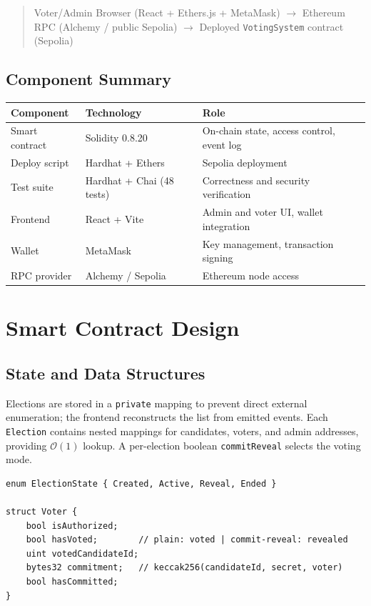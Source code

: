 \documentclass[11pt]{article}
\begin{document}
\begin{quote}
Voter/Admin Browser (React + Ethers.js + MetaMask) $\rightarrow$ Ethereum RPC (Alchemy /
public Sepolia) $\rightarrow$ Deployed \texttt{VotingSystem} contract (Sepolia)
\end{quote}

\subsection{Component Summary}
\begin{center}
\begin{tabular}{@{}lll@{}}
\toprule
\textbf{Component} & \textbf{Technology} & \textbf{Role} \\
\midrule
Smart contract & Solidity 0.8.20 & On-chain state, access control, event log \\
Deploy script & Hardhat + Ethers & Sepolia deployment \\
Test suite & Hardhat + Chai (48 tests) & Correctness and security verification \\
Frontend & React + Vite & Admin and voter UI, wallet integration \\
Wallet & MetaMask & Key management, transaction signing \\
RPC provider & Alchemy / Sepolia & Ethereum node access \\
\bottomrule
\end{tabular}
\end{center}

\section{Smart Contract Design}

\subsection{State and Data Structures}
Elections are stored in a \texttt{private} mapping to prevent direct external enumeration;
the frontend reconstructs the list from emitted events. Each \texttt{Election} contains
nested mappings for candidates, voters, and admin addresses, providing $\mathcal{O}(1)$
lookup. A per-election boolean \texttt{commitReveal} selects the voting mode.

\begin{lstlisting}[language=Solidity]
enum ElectionState { Created, Active, Reveal, Ended }

struct Voter {
    bool isAuthorized;
    bool hasVoted;        // plain: voted | commit-reveal: revealed
    uint votedCandidateId;
    bytes32 commitment;   // keccak256(candidateId, secret, voter)
    bool hasCommitted;
}
\end{lstlisting}
\end{document}

